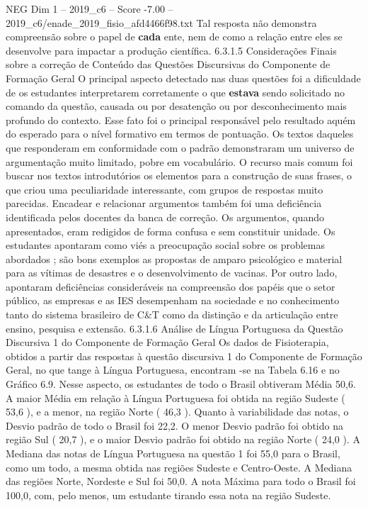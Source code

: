 \begin{textsample}{NEG Dim 1 – 2019\_c6 – Score -7.00 – 2019\_c6/enade\_2019\_fisio\_afd4466f98.txt}
Tal resposta não demonstra compreensão sobre o papel de \textbf{cada} ente, nem de como a relação entre eles se desenvolve para impactar a produção científica. 6.3.1.5 Considerações Finais sobre a correção de Conteúdo das Questões Discursivas do Componente de Formação Geral O principal aspecto detectado nas duas questões foi a dificuldade de os estudantes interpretarem corretamente o que \textbf{estava} sendo solicitado no comando da questão, causada ou por desatenção ou por desconhecimento mais profundo do contexto.
Esse fato foi o principal responsável pelo resultado aquém do esperado para o nível formativo em termos de pontuação.
Os textos daqueles que responderam em conformidade com o padrão demonstraram um universo de argumentação muito limitado, pobre em vocabulário.
O recurso mais comum foi buscar nos textos introdutórios os elementos para a construção de suas frases, o que criou uma peculiaridade interessante, com grupos de respostas muito parecidas.
Encadear e relacionar argumentos também foi uma deficiência identificada pelos docentes da banca de correção.
Os argumentos, quando apresentados, eram redigidos de forma confusa e sem constituir unidade.
Os estudantes apontaram como viés a preocupação social sobre os problemas abordados ; são bons exemplos as propostas de amparo psicológico e material para as vítimas de desastres e o desenvolvimento de vacinas.
Por outro lado, apontaram deficiências consideráveis na compreensão dos papéis que o setor público, as empresas e as IES desempenham na sociedade e no conhecimento tanto do sistema brasileiro de C\&T como da distinção e da articulação entre ensino, pesquisa e extensão. 6.3.1.6 Análise de Língua Portuguesa da Questão Discursiva 1 do Componente de Formação Geral Os dados de Fisioterapia, obtidos a partir das respostas à questão discursiva 1 do Componente de Formação Geral, no que tange à Língua Portuguesa, encontram -se na Tabela 6.16 e no Gráfico 6.9.
Nesse aspecto, os estudantes de todo o Brasil obtiveram Média 50,6.
A maior Média em relação à Língua Portuguesa foi obtida na região Sudeste ( 53,6 ), e a menor, na região Norte ( 46,3 ).
Quanto à variabilidade das notas, o Desvio padrão de todo o Brasil foi 22,2.
O menor Desvio padrão foi obtido na região Sul ( 20,7 ), e o maior Desvio padrão foi obtido na região Norte ( 24,0 ).
A Mediana das notas de Língua Portuguesa na questão 1 foi 55,0 para o Brasil, como um todo, a mesma obtida nas regiões Sudeste e Centro-Oeste.
A Mediana das regiões Norte, Nordeste e Sul foi 50,0.
A nota Máxima para todo o Brasil foi 100,0, com, pelo menos, um estudante tirando essa nota na região Sudeste.

\end{textsample}
